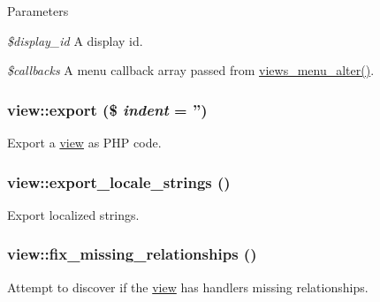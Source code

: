 \begin{DoxyParams}{Parameters}
\item[{\em \$display\_\-id}]A display id. \item[{\em \$callbacks}]A menu callback array passed from \hyperlink{views_8module_a927f922bf3e583010e7deb46db1cbb4e}{views\_\-menu\_\-alter()}. \end{DoxyParams}
\hypertarget{classview_a74dee74c2fbad9c0dc3450414d80216e}{
\subsubsection[{export}]{\setlength{\rightskip}{0pt plus 5cm}view::export (\$ {\em indent} = {\ttfamily ''})}}
\label{classview_a74dee74c2fbad9c0dc3450414d80216e}
Export a \hyperlink{classview}{view} as PHP code. \hypertarget{classview_aa2e9f044446b2bd780abee1080640392}{
\subsubsection[{export\_\-locale\_\-strings}]{\setlength{\rightskip}{0pt plus 5cm}view::export\_\-locale\_\-strings ()}}
\label{classview_aa2e9f044446b2bd780abee1080640392}
Export localized strings. \hypertarget{classview_a7bdc3ece9cac87a5a0bee5166f0373a8}{
\subsubsection[{fix\_\-missing\_\-relationships}]{\setlength{\rightskip}{0pt plus 5cm}view::fix\_\-missing\_\-relationships ()}}
\label{classview_a7bdc3ece9cac87a5a0bee5166f0373a8}
Attempt to discover if the \hyperlink{classview}{view} has handlers missing relationships.

